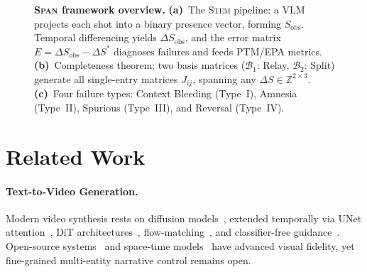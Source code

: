 \documentclass[sigconf,review,anonymous]{acmart}
\theoremstyle{definition}
\newcommand{\diagonal}{\textsc{Span}}
\newcommand{\stem}{\textsc{Stem}}
\newcommand{\calB}{\mathcal{B}}
\begin{document}
\begin{figure}[t]
\begin{minipage}[t]{0.46\textwidth}
\end{minipage}%
%
\vspace{12pt} 
\caption{\textbf{\diagonal{} framework overview.}
\textbf{(a)}~The \stem{} pipeline: a VLM projects each shot into a binary presence vector, forming $S_\text{obs}$. Temporal differencing yields $\Delta S_\text{obs}$, and the error matrix $E = \Delta S_\text{obs} - \Delta S^*$ diagnoses failures and feeds PTM/EPA metrics.
\textbf{(b)}~Completeness theorem: two basis matrices ($\calB_1$: Relay, $\calB_2$: Split) generate all single-entry matrices $J_{ij}$, spanning any $\Delta S \in \mathbb{Z}^{2\times3}$.
\textbf{(c)}~Four failure types: Context Bleeding (Type~I), Amnesia (Type~II), Spurious (Type~III), and Reversal (Type~IV).}
\label{fig:overview}
\end{figure}



\section{Related Work}
\label{sec:related}

\paragraph{Text-to-Video Generation.}
Modern video synthesis rests on diffusion models~\cite{ddpm,ldm,scoreflow}, extended temporally via UNet attention~\cite{svd,imagenvideo,ho2022video}, DiT architectures~\cite{dit,wan,sora}, flow-matching~\cite{flowmatching}, and classifier-free guidance~\cite{cfg}. Open-source systems~\cite{opensora,animatediff} and space-time models~\cite{lumiere,emuvideo} have advanced visual fidelity, yet fine-grained multi-entity narrative control remains open.
\end{document}

